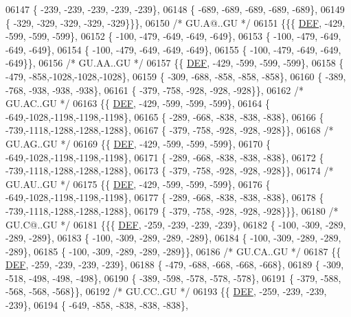 \begin{DoxyCode}
06147 \{ -239, -239, -239, -239, -239\},
06148 \{ -689, -689, -689, -689, -689\},
06149 \{ -329, -329, -329, -329, -329\}\}\},
06150 \textcolor{comment}{/* GU.A@..GU */}
06151 \{\{\{  \mbox{\hyperlink{1_88_84__epars_8h_a397419fc12b37ed479c8abb9d444d843}{DEF}}, -429, -599, -599, -599\},
06152 \{ -100, -479, -649, -649, -649\},
06153 \{ -100, -479, -649, -649, -649\},
06154 \{ -100, -479, -649, -649, -649\},
06155 \{ -100, -479, -649, -649, -649\}\},
06156 \textcolor{comment}{/* GU.AA..GU */}
06157 \{\{  \mbox{\hyperlink{1_88_84__epars_8h_a397419fc12b37ed479c8abb9d444d843}{DEF}}, -429, -599, -599, -599\},
06158 \{ -479, -858,-1028,-1028,-1028\},
06159 \{ -309, -688, -858, -858, -858\},
06160 \{ -389, -768, -938, -938, -938\},
06161 \{ -379, -758, -928, -928, -928\}\},
06162 \textcolor{comment}{/* GU.AC..GU */}
06163 \{\{  \mbox{\hyperlink{1_88_84__epars_8h_a397419fc12b37ed479c8abb9d444d843}{DEF}}, -429, -599, -599, -599\},
06164 \{ -649,-1028,-1198,-1198,-1198\},
06165 \{ -289, -668, -838, -838, -838\},
06166 \{ -739,-1118,-1288,-1288,-1288\},
06167 \{ -379, -758, -928, -928, -928\}\},
06168 \textcolor{comment}{/* GU.AG..GU */}
06169 \{\{  \mbox{\hyperlink{1_88_84__epars_8h_a397419fc12b37ed479c8abb9d444d843}{DEF}}, -429, -599, -599, -599\},
06170 \{ -649,-1028,-1198,-1198,-1198\},
06171 \{ -289, -668, -838, -838, -838\},
06172 \{ -739,-1118,-1288,-1288,-1288\},
06173 \{ -379, -758, -928, -928, -928\}\},
06174 \textcolor{comment}{/* GU.AU..GU */}
06175 \{\{  \mbox{\hyperlink{1_88_84__epars_8h_a397419fc12b37ed479c8abb9d444d843}{DEF}}, -429, -599, -599, -599\},
06176 \{ -649,-1028,-1198,-1198,-1198\},
06177 \{ -289, -668, -838, -838, -838\},
06178 \{ -739,-1118,-1288,-1288,-1288\},
06179 \{ -379, -758, -928, -928, -928\}\}\},
06180 \textcolor{comment}{/* GU.C@..GU */}
06181 \{\{\{  \mbox{\hyperlink{1_88_84__epars_8h_a397419fc12b37ed479c8abb9d444d843}{DEF}}, -259, -239, -239, -239\},
06182 \{ -100, -309, -289, -289, -289\},
06183 \{ -100, -309, -289, -289, -289\},
06184 \{ -100, -309, -289, -289, -289\},
06185 \{ -100, -309, -289, -289, -289\}\},
06186 \textcolor{comment}{/* GU.CA..GU */}
06187 \{\{  \mbox{\hyperlink{1_88_84__epars_8h_a397419fc12b37ed479c8abb9d444d843}{DEF}}, -259, -239, -239, -239\},
06188 \{ -479, -688, -668, -668, -668\},
06189 \{ -309, -518, -498, -498, -498\},
06190 \{ -389, -598, -578, -578, -578\},
06191 \{ -379, -588, -568, -568, -568\}\},
06192 \textcolor{comment}{/* GU.CC..GU */}
06193 \{\{  \mbox{\hyperlink{1_88_84__epars_8h_a397419fc12b37ed479c8abb9d444d843}{DEF}}, -259, -239, -239, -239\},
06194 \{ -649, -858, -838, -838, -838\},

\end{DoxyCode}
